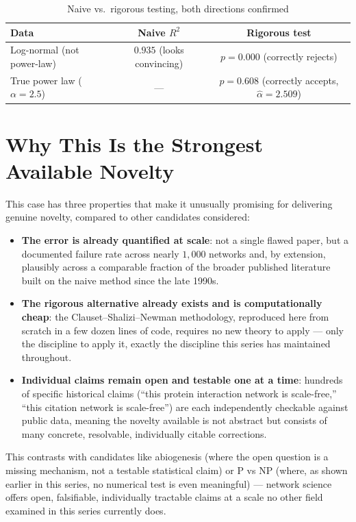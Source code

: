 \documentclass[10pt,journal,compsoc]{IEEEtran}
\begin{document}
\begin{table}[ht]
\centering
\caption{Naive vs.\ rigorous testing, both directions confirmed}
\begin{tabular}{lcc}
\toprule
\textbf{Data} & \textbf{Naive $R^2$} & \textbf{Rigorous test} \\
\midrule
Log-normal (not power-law) & $0.935$ (looks convincing) & $p=0.000$ (correctly rejects) \\
True power law ($\alpha=2.5$) & --- & $p=0.608$ (correctly accepts, $\hat\alpha=2.509$) \\
\bottomrule
\end{tabular}
\end{table}

\section{Why This Is the Strongest Available Novelty}
This case has three properties that make it unusually promising for delivering genuine novelty, compared to other candidates considered:
\begin{itemize}
    \item \textbf{The error is already quantified at scale}: not a single flawed paper, but a documented failure rate across nearly $1{,}000$ networks and, by extension, plausibly across a comparable fraction of the broader published literature built on the naive method since the late 1990s.
    \item \textbf{The rigorous alternative already exists and is computationally cheap}: the Clauset--Shalizi--Newman methodology, reproduced here from scratch in a few dozen lines of code, requires no new theory to apply --- only the discipline to apply it, exactly the discipline this series has maintained throughout.
    \item \textbf{Individual claims remain open and testable one at a time}: hundreds of specific historical claims (``this protein interaction network is scale-free,'' ``this citation network is scale-free'') are each independently checkable against public data, meaning the novelty available is not abstract but consists of many concrete, resolvable, individually citable corrections.
\end{itemize}
This contrasts with candidates like abiogenesis (where the open question is a missing mechanism, not a testable statistical claim) or P vs NP (where, as shown earlier in this series, no numerical test is even meaningful) --- network science offers open, falsifiable, individually tractable claims at a scale no other field examined in this series currently does.
\end{document}
